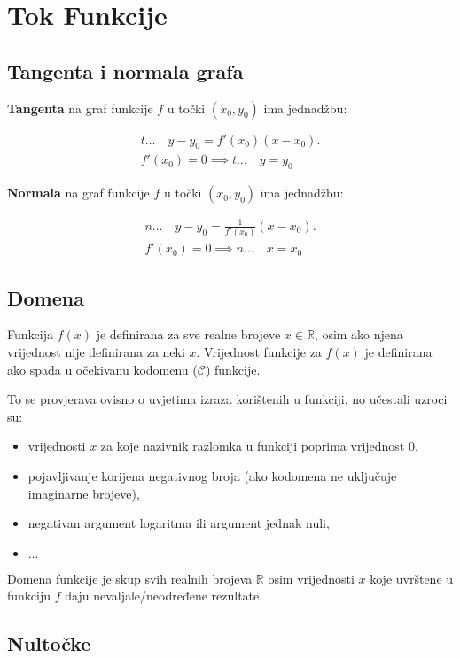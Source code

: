 \section{Tok Funkcije}

\subsection{Tangenta i normala grafa}

\textbf{Tangenta} na graf funkcije $f$ u točki $(x_0,y_0)$ ima jednadžbu:

\begin{gather*}
t\dots\quad y-y_0=f'(x_0)(x-x_0).\\
f'(x_0)=0\implies t\dots\quad y = y_0
\end{gather*}

\noindent
\textbf{Normala} na graf funkcije $f$ u točki $(x_0,y_0)$ ima jednadžbu:

\begin{gather*}
n\dots\quad y-y_0=\frac{1}{f'(x_0)}(x-x_0).\\
f'(x_0)=0\implies n\dots\quad x = x_0
\end{gather*}


\subsection{Domena}

Funkcija $f(x)$ je definirana za sve realne brojeve $x\in\mathbb{R}$, osim ako
njena vrijednost nije definirana za neki $x$. Vrijednost funkcije za $f(x)$ je
definirana ako spada u očekivanu kodomenu ($\mathcal{C}$) funkcije.

To se provjerava ovisno o uvjetima izraza korištenih u funkciji, no učestali
uzroci su:
\begin{itemize}
    \item vrijednosti $x$ za koje nazivnik razlomka u funkciji poprima vrijednost $0$,
    \item pojavljivanje korijena negativnog broja (ako kodomena ne uključuje imaginarne brojeve),
    \item negativan argument logaritma ili argument jednak nuli,
    \item $\dots$
\end{itemize}

\noindent
Domena funkcije je skup svih realnih brojeva $\mathbb{R}$ osim vrijednosti $x$
koje uvrštene u funkciju $f$ daju nevaljale/neodređene rezultate.

\subsection{Nultočke}

